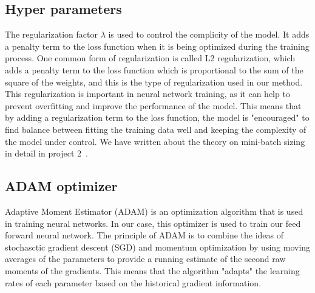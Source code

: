 \documentclass[reprint,english,notitlepage]{revtex4-1}  %
\begin{document}
\subsection{Hyper parameters}\label{theory:hyper-parameters}
The regularization factor $\lambda$ is used to control the complicity of the model. It adds a penalty term to the loss function when it is being optimized during the training process. One common form of regularization is called L2 regularization, which adds a penalty term to the loss function which is proportional to the sum of the square of the weights, and this is the type of regularization used in our method. 
This regularization is important in neural network training, as it can help to prevent overfitting and improve the performance of the model. This means that by adding a regularization term to the loss function, the model is "encouraged" to find balance between fitting the training data well and keeping the complexity of the model under control. 
We have written about the theory on mini-batch sizing in detail in project 2~\cite{proj2}. 


\subsection{ADAM optimizer}\label{Adam}
Adaptive Moment Estimator (ADAM) is an optimization algorithm that is used in training neural networks. In our case, this optimizer is used to train our feed forward neural network. The principle of ADAM is to combine the ideas of stochasctic gradient descent (SGD) and momentum optimization by using moving averages of the parameters to provide a running estimate of the second raw moments of the gradients. This means that the algorithm "adapts" the learning rates of each parameter based on the historical gradient information.
\end{document}
